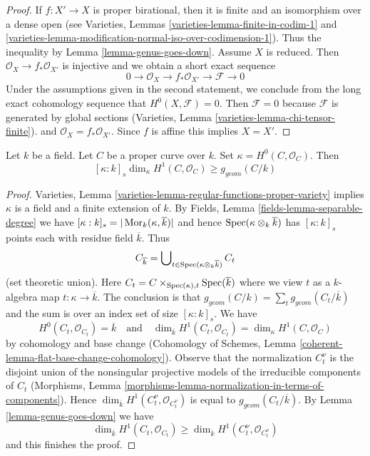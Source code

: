 \begin{proof}
If $f : X' \to X$ is proper birational, then it is finite and
an isomorphism over a dense open (see
Varieties, Lemmas \ref{varieties-lemma-finite-in-codim-1} and
\ref{varieties-lemma-modification-normal-iso-over-codimension-1}).
Thus the inequality by Lemma \ref{lemma-genus-goes-down}.
Assume $X$ is reduced. Then $\mathcal{O}_X \to f_*\mathcal{O}_{X'}$
is injective and we obtain a short exact sequence
$$
0 \to \mathcal{O}_X \to f_*\mathcal{O}_{X'} \to \mathcal{F} \to 0
$$
Under the assumptions given in the second statement,
we conclude from the long exact cohomology sequence that
$H^0(X, \mathcal{F}) = 0$. Then $\mathcal{F} = 0$ because
$\mathcal{F}$ is generated by global sections
(Varieties, Lemma \ref{varieties-lemma-chi-tensor-finite}).
and $\mathcal{O}_X = f_*\mathcal{O}_{X'}$. Since $f$ is affine
this implies $X = X'$.
\end{proof}

\begin{lemma}
\label{lemma-bound-geometric-genus-curve}
Let $k$ be a field. Let $C$ be a proper curve over $k$.
Set $\kappa = H^0(C, \mathcal{O}_C)$. Then
$$
[\kappa : k]_s \dim_\kappa H^1(C, \mathcal{O}_C) \geq g_{geom}(C/k)
$$
\end{lemma}

\begin{proof}
Varieties, Lemma \ref{varieties-lemma-regular-functions-proper-variety}
implies $\kappa$ is a field and a finite extension of $k$.
By Fields, Lemma \ref{fields-lemma-separable-degree}
we have $[\kappa : k]_s = |\mathop{\mathrm{Mor}}\nolimits_k(\kappa, \overline{k})|$
and hence $\mathop{\mathrm{Spec}}(\kappa \otimes_k \overline{k})$ has
$[\kappa : k]_s$ points each with residue field $\overline{k}$.
Thus
$$
C_{\overline{k}} =
\bigcup\nolimits_{t \in \mathop{\mathrm{Spec}}(\kappa \otimes_k \overline{k})} C_t
$$
(set theoretic union). Here
$C_t = C \times_{\mathop{\mathrm{Spec}}(\kappa), t} \mathop{\mathrm{Spec}}(\overline{k})$ where
we view $t$ as a $k$-algebra map $t : \kappa \to \overline{k}$.
The conclusion is that $g_{geom}(C/k) = \sum_t g_{geom}(C_t/\overline{k})$
and the sum is over an index set of size $[\kappa : k]_s$.
We have
$$
H^0(C_t, \mathcal{O}_{C_t}) = \overline{k}
\quad\text{and}\quad
\dim_{\overline{k}} H^1(C_t, \mathcal{O}_{C_t}) =
\dim_\kappa H^1(C, \mathcal{O}_C)
$$
by cohomology and base change
(Cohomology of Schemes, Lemma \ref{coherent-lemma-flat-base-change-cohomology}).
Observe that the normalization $C_t^\nu$ is the disjoint
union of the nonsingular projective models of the
irreducible components of $C_t$
(Morphisms, Lemma \ref{morphisms-lemma-normalization-in-terms-of-components}).
Hence $\dim_{\overline{k}} H^1(C_t^\nu, \mathcal{O}_{C_t^\nu})$
is equal to $g_{geom}(C_t/\overline{k})$.
By Lemma \ref{lemma-genus-goes-down} we have
$$
\dim_{\overline{k}} H^1(C_t, \mathcal{O}_{C_t}) \geq
\dim_{\overline{k}} H^1(C_t^\nu, \mathcal{O}_{C_t^\nu})
$$
and this finishes the proof.
\end{proof}

